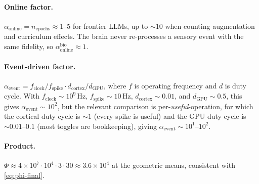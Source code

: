 \documentclass[11pt]{article}
\providecommand{\hertz}{\ensuremath{\mathrm{Hz}}}
\theoremstyle{definition}
\theoremstyle{remark}
\begin{document}
\paragraph{Online factor.}
$\alpha_{\mathrm{online}} = n_{\mathrm{epochs}}\approx 1$--$5$ for
frontier LLMs, up to $\sim\!10$ when counting augmentation and
curriculum effects.  The brain never re-processes a sensory event
with the same fidelity, so $\alpha_{\mathrm{online}}^{\mathrm{bio}}\approx 1$.

\paragraph{Event-driven factor.}
$\alpha_{\mathrm{event}} = f_{\mathrm{clock}}/f_{\mathrm{spike}}\cdot d_{\mathrm{cortex}}/d_{\mathrm{GPU}}$,
where $f$ is operating frequency and $d$ is duty cycle.  With
$f_{\mathrm{clock}}\sim 10^{9}\,\si{\hertz}$, $f_{\mathrm{spike}}\sim 10\,\si{\hertz}$,
$d_{\mathrm{cortex}}\sim 0.01$, and $d_{\mathrm{GPU}}\sim 0.5$, this
gives $\alpha_{\mathrm{event}}\sim 10^{2}$, but the relevant
comparison is per-\emph{useful}-operation, for which the cortical
duty cycle is $\sim\!1$ (every spike is useful) and the GPU duty
cycle is $\sim\!0.01$--$0.1$ (most toggles are bookkeeping), giving
$\alpha_{\mathrm{event}}\sim 10^{1}$--$10^{2}$.

\paragraph{Product.}
$\Phi\approx 4\times 10^{7}\cdot 10^{4}\cdot 3\cdot 30\approx 3.6\times 10^{4}$
at the geometric means, consistent with \cref{eq:phi-final}.
\end{document}
